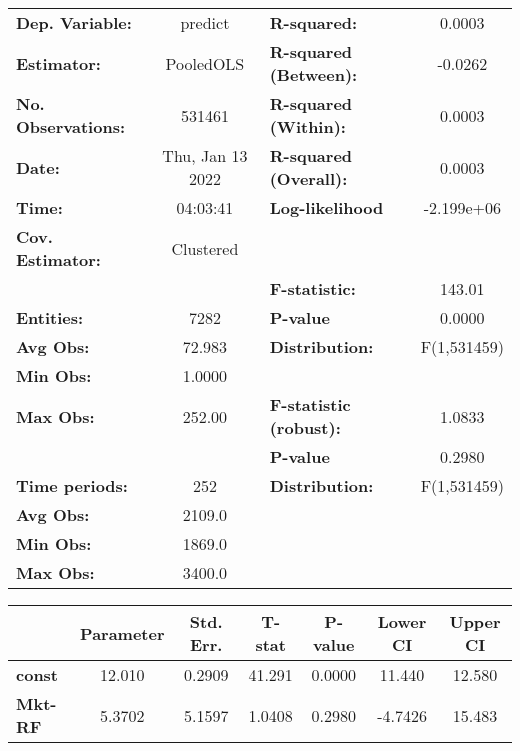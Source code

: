 \begin{center}
\begin{tabular}{lclc}
\toprule
\textbf{Dep. Variable:}    &      predict       & \textbf{  R-squared:         }   &      0.0003      \\
\textbf{Estimator:}        &     PooledOLS      & \textbf{  R-squared (Between):}  &     -0.0262      \\
\textbf{No. Observations:} &       531461       & \textbf{  R-squared (Within):}   &      0.0003      \\
\textbf{Date:}             &  Thu, Jan 13 2022  & \textbf{  R-squared (Overall):}  &      0.0003      \\
\textbf{Time:}             &      04:03:41      & \textbf{  Log-likelihood     }   &    -2.199e+06    \\
\textbf{Cov. Estimator:}   &     Clustered      & \textbf{                     }   &                  \\
\textbf{}                  &                    & \textbf{  F-statistic:       }   &      143.01      \\
\textbf{Entities:}         &        7282        & \textbf{  P-value            }   &      0.0000      \\
\textbf{Avg Obs:}          &       72.983       & \textbf{  Distribution:      }   &   F(1,531459)    \\
\textbf{Min Obs:}          &       1.0000       & \textbf{                     }   &                  \\
\textbf{Max Obs:}          &       252.00       & \textbf{  F-statistic (robust):} &      1.0833      \\
\textbf{}                  &                    & \textbf{  P-value            }   &      0.2980      \\
\textbf{Time periods:}     &        252         & \textbf{  Distribution:      }   &   F(1,531459)    \\
\textbf{Avg Obs:}          &       2109.0       & \textbf{                     }   &                  \\
\textbf{Min Obs:}          &       1869.0       & \textbf{                     }   &                  \\
\textbf{Max Obs:}          &       3400.0       & \textbf{                     }   &                  \\
\bottomrule
\end{tabular}
\begin{tabular}{lcccccc}
                & \textbf{Parameter} & \textbf{Std. Err.} & \textbf{T-stat} & \textbf{P-value} & \textbf{Lower CI} & \textbf{Upper CI}  \\
\midrule
\textbf{const}  &       12.010       &       0.2909       &      41.291     &      0.0000      &       11.440      &       12.580       \\
\textbf{Mkt-RF} &       5.3702       &       5.1597       &      1.0408     &      0.2980      &      -4.7426      &       15.483       \\
\bottomrule
\end{tabular}
\end{center}
